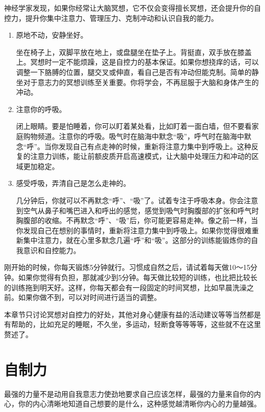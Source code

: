 \documentclass[12pt,oneside]{book}
\begin{document}
\begin{mdframed}
神经学家发现，如果你经常让大脑冥想，它不仅会变得擅长冥想，还会提升你的自控力，提升你集中注意力、管理压力、克制冲动和认识自我的能力。

\begin{enumerate}
\item 原地不动，安静坐好。

坐在椅子上，双脚平放在地上，或盘腿坐在垫子上。背挺直，双手放在膝盖上。冥想时一定不能烦躁，这是自控力的基本保证。如果你想挠痒的话，可以调整一下胳膊的位置，腿交叉或伸直，看自己是否有冲动但能克制。简单的静坐对于意志力的冥想训练至关重要。你将学会，不再屈服于大脑和身体产生的冲动。

\item 注意你的呼吸。

闭上眼睛。要是怕睡着，你可以盯着某处看，比如盯着一面白墙，但不要看家庭购物频道。注意你的呼吸。吸气时在脑海中默念“吸”，呼气时在脑海中默念“呼”。当你发现自己有点走神的时候，重新将注意力集中到呼吸上。这种反复的注意力训练，能让前额皮质开启高速模式，让大脑中处理压力和冲动的区域更加稳定。

\item 感受呼吸，弄清自己是怎么走神的。

几分钟后，你就可以不再默念“呼”、“吸”了。试着专注于呼吸本身。你会注意到空气从鼻子和嘴巴进入和呼出的感觉，感觉到吸气时胸腹部的扩张和呼气时胸腹部的收缩。不再默念“呼”、“吸”后，你可能更容易走神。像之前一样，当你发现自己在想别的事情时，重新将注意力集中到呼吸上。如果你觉得很难重新集中注意力，就在心里多默念几遍“呼”和“吸”。这部分的训练能锻炼你的自我意识和自控能力。
\end{enumerate}


刚开始的时候，你每天锻炼5分钟就行。习惯成自然之后，请试着每天做10～15分钟。如果你觉得有负担，那就减少到5分钟。每天做比较短的训练，也比把比较长的训练拖到明天好。这样，你每天都会有一段固定的时间冥想，比如早晨洗澡之前。如果你做不到，可以对时间进行适当的调整。

\end{mdframed}

本章节只讨论冥想对自控力的好处，其他对身心健康有益的活动建议等等当然都是有帮助的，比如充足的睡眠，不久坐，多运动，轻断食等等等等，这些就不在这里赘述了。

\section{自制力}
最强的力量不是动用自我意志力使劲地要求自己应该怎样，最强的力量来自你的内心，你的内心清晰地知道自己想要的是什么，这种感觉越清晰你内心的力量越强。
\end{document}
